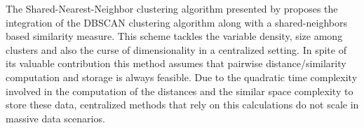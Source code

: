 \documentclass[10pt]{article}
\begin{document}
The Shared-Nearest-Neighbor clustering algorithm presented by \cite{ESK03} proposes the integration of the DBSCAN clustering algorithm along with a shared-neighbors based similarity measure. 
This scheme tackles the variable density, size among clusters and also the curse of dimensionality in a centralized setting. 
In spite of its valuable contribution this method assumes that pairwise distance/similarity computation and storage is always feasible. 
Due to the quadratic time complexity involved in the computation of the distances and the similar space complexity to store these data, centralized methods that rely on this calculations do not scale in massive data scenarios.  

\end{document}
